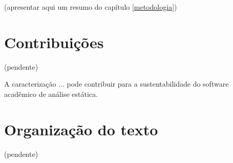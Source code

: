 (apresentar aqui um resumo do capítulo \ref{metodologia})


\section{Contribuições}

(pendente)

A caracterização ... pode contribuir para a sustentabilidade do software acadêmico de análise estática.

\section{Organização do texto}

(pendente)

%
%
%
%
%


